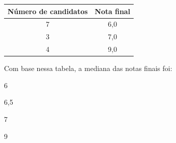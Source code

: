 \begin{escolha}
\begin{boxmedio}
\begin{boxmedio}
{\begin{boxpeq}
\begin{boxpeq}
{\begin{boxpeq}
\begin{boxmedio}
\begin{boxmedio}
\begin{boxpeq}
\begin{boxmedio}
\begin{boxpeq}
\begin{boxpeq}
\begin{boxpeq}
\begin{boxpeq}
\begin{boxmedio}
{\begin{boxmedio}
\begin{boxmedio}
\begin{boxpeq}
\begin{boxmedio}
\begin{boxpeq}
\begin{boxpeq}
\begin{boxpeq}
\begin{escolha}
{\begin{boxmedio}
\begin{boxpeq}
\begin{boxpeq}
\begin{boxpeq}
\begin{boxpeq}
\begin{boxpeq}
\begin{boxmedio}
\begin{boxpeq}
\begin{boxpeq}
\begin{boxpeq}
{\begin{boxpeq}
\begin{boxmedio}
\begin{boxpeq}
\begin{boxpeq}
\begin{boxpeq}
{\begin{boxpeq}
\begin{boxmedio}
{\begin{boxpeq}
\begin{boxpeq}
\begin{boxmedio}
\begin{boxmedio}
\begin{boxpeq}
\begin{boxpeq}
{\begin{boxpeq}
\begin{boxpeq}
\begin{boxpeq}
\begin{boxpeq}
\begin{boxpeq}
\begin{escolha}
\begin{escolha}
{\begin{boxmedio}
\begin{boxpeq}
\begin{q°}
\begin{boxmedio}
\begin{boxpeq}
\begin{boxpeq}
\begin{boxmedio}
\begin{boxmedio}
\begin{boxmedio}
\begin{boxmedio}
{\begin{enumerate}
\begin{boxpeq}
{\begin{boxpeq}
\begin{boxpeq}
\begin{boxmedio}
\begin{boxpeq}
\begin{boxpeq}
\begin{boxpeq}
\begin{escolha}
\begin{escolha}
\begin{table}[]
\begin{tabular}{|c|c|}
\textbf{Número de candidatos} & \textbf{Nota final} \\ \hline
\rowcolor[HTML]{DAE8FC} 
7 & 6,0 \\ \hline
3 & 7,0 \\ \hline
\rowcolor[HTML]{DAE8FC} 
4 & 9,0 \\ \hline
\end{tabular}
\end{table}

Com base nessa tabela, a mediana das notas finais foi:

\begin{escolha}

  \item 6

  \item 6,5

  \item 7

  \item 9

\begin{escolha}


\end{escolha}
\end{escolha}
\end{escolha}
\end{escolha}
\end{boxpeq}
\end{boxpeq}
\end{boxpeq}
\end{boxmedio}
\end{boxpeq}
\end{boxpeq}}
\end{boxpeq}
\end{enumerate}}
\end{boxmedio}
\end{boxmedio}
\end{boxmedio}
\end{boxmedio}
\end{boxpeq}
\end{boxpeq}
\end{boxmedio}
\end{q°}
\end{boxpeq}
\end{boxmedio}}
\end{escolha}
\end{escolha}
\end{boxpeq}
\end{boxpeq}
\end{boxpeq}
\end{boxpeq}
\end{boxpeq}}
\end{boxpeq}
\end{boxpeq}
\end{boxmedio}
\end{boxmedio}
\end{boxpeq}
\end{boxpeq}}
\end{boxmedio}
\end{boxpeq}}
\end{boxpeq}
\end{boxpeq}
\end{boxpeq}
\end{boxmedio}
\end{boxpeq}}
\end{boxpeq}
\end{boxpeq}
\end{boxpeq}
\end{boxmedio}
\end{boxpeq}
\end{boxpeq}
\end{boxpeq}
\end{boxpeq}
\end{boxpeq}
\end{boxmedio}}
\end{escolha}
\end{boxpeq}
\end{boxpeq}
\end{boxpeq}
\end{boxmedio}
\end{boxpeq}
\end{boxmedio}
\end{boxmedio}}
\end{boxmedio}
\end{boxpeq}
\end{boxpeq}
\end{boxpeq}
\end{boxpeq}
\end{boxmedio}
\end{boxpeq}
\end{boxmedio}
\end{boxmedio}
\end{boxpeq}}
\end{boxpeq}
\end{boxpeq}}
\end{boxmedio}
\end{boxmedio}
\end{escolha}
